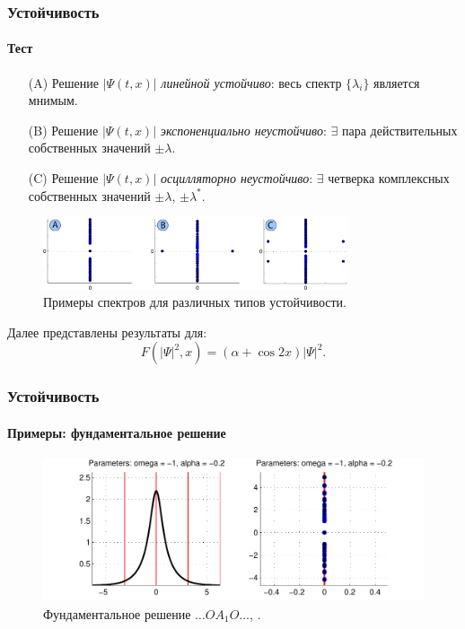 \documentclass [10pt] {beamer}
\begin{document}
\begin{frame}
	\frametitle{Устойчивость}
	\framesubtitle{Тест}
	
	\begin{enumerate}
		\item[(A)] Решение $|\Psi(t, x)|$ {\it {\color{forestgreen} линейной устойчиво}}: весь спектр $\{ \lambda_i \}$ является мнимым.
		\item[(B)] Решение $|\Psi(t, x)|$ {\it {\color{fireenginered} экспоненциально неустойчиво}}: $\exists$ пара действительных собственных значений $\pm \lambda$.
		\item[(C)] Решение $|\Psi(t, x)|$ {\it {\color{fireenginered} осцилляторно неустойчиво}}: $\exists$ четверка комплексных собственных значений $\pm \lambda$, $\pm \lambda^*$.
	\end{enumerate}
	
	\begin{figure}
		\includegraphics[width=0.8\textwidth]{pic/test.pdf}
		\caption{Примеры спектров для различных типов устойчивости.}
		\label{pic:test}
	\end{figure}
	
	Далее представлены результаты для:
	$$F(|\Psi|^2, x) = (\alpha + \cos 2x) |\Psi|^2.$$
\end{frame}

\begin{frame}
	\frametitle{Устойчивость}
	\framesubtitle{Примеры: фундаментальное решение}
	
	\begin{figure}
		\includegraphics[width=1\textwidth]{pic/example_1.pdf}
		\caption{Фундаментальное решение $\dots O A_1 O \dots$, {\it \color{forestgreen}{линейно устойчиво}}.}
		\label{pic:example_1}
	\end{figure}
\end{frame}
\end{document}
